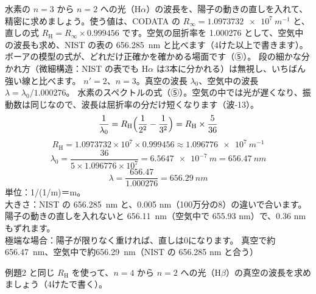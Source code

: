 \label{ph:原-4:ex2}
\begin{phreidai}
水素の $n=3$ から $n=2$ への光（H$\alpha$）の波長を、陽子の動きの直しを入れて、精密に求めましょう。使う値は、CODATA の $R_\infty=\qty{1.0973732e7}{m^{-1}}$ と、直しの式 $R_{\mathrm H}=R_\infty\times0.999456$ です。空気の屈折率を 1.000276 として、空気中の波長も求め、NIST の表の \qty{656.285}{nm} と比べます（4けた以上で書きます）。
\phbamen
ボーアの模型の式が、どれだけ正確かを確かめる場面です（⑤）。
\phmushi
段の細かな分かれ方（微細構造：NIST の表でも H$\alpha$ は3本に分かれる）は無視し、いちばん強い線と比べます。
\phzu
$n'=2$、$n=3$。真空の波長 $\lambda_0$、空気中の波長 $\lambda=\lambda_0/1.000276$。
\phriyu
水素のスペクトルの式（⑤）。空気の中では光が遅くなり、振動数は同じなので、波長は屈折率の分だけ短くなります（波-13）。
\phtateru
\[ \frac{1}{\lambda_0}=R_{\mathrm H}\Bigl(\frac{1}{2^2}-\frac{1}{3^2}\Bigr)=R_{\mathrm H}\times\frac{5}{36} \]
\phtoku
\[ R_{\mathrm H}=1.0973732\times10^7\times0.999456\approx\qty{1.096776e7}{m^{-1}} \]
\[ \lambda_0=\frac{36}{5\times1.096776\times10^{7}}=\qty{6.5647e-7}{m}=\qty{656.47}{nm} \]
\[ \lambda=\frac{656.47}{1.000276}=\qty{656.29}{nm} \]
\phtashikame
単位：1/(1/m)＝m。\\
大きさ：NIST の \qty{656.285}{nm} と、0.005 nm（100万分の8）の違いで合います。陽子の動きの直しを入れないと \qty{656.11}{nm}（空気中で 655.93 nm）で、0.36 nm もずれます。\\
極端な場合：陽子が限りなく重ければ、直しは0になります。
\kotae 真空で約\qty{656.47}{nm}、空気中で約\qty{656.29}{nm}（NIST の 656.285 nm と合う）
\end{phreidai}
\begin{jibun}
例題2 と同じ $R_{\mathrm H}$ を使って、$n=4$ から $n=2$ への光（H$\beta$）の真空の波長を求めましょう（4けたで書く）。
\end{jibun}

